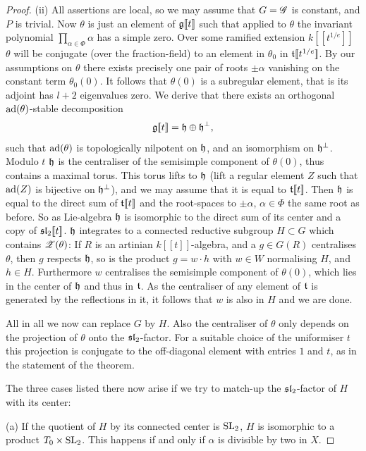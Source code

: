 \documentclass[12pt,english]{smfart}
\theoremstyle{plain} \newtheorem{innerthm}{Theorem} \newtheorem{innerlem}{Lemma} \newtheorem{innerprop}{Proposition} \newtheorem{innercor}{Corollary} \theoremstyle{definition} \newtheorem{innerdefn}{Definition} \newtheorem{innerconstr}{Construction} \theoremstyle{remark} \newtheorem*{remark}{Remark} \newtheorem*{remarks}{Remarks} \newtheorem*{applications}{Applications}
\begin{document}
\begin{proof}
(ii) All assertions are local, so we may assume that $G=\mathscr{G}$ is constant, and $P$ is trivial. Now $\theta$ is just an element of $\mathfrak{g}[\![t]\!]$ such that applied to $\theta$ the invariant polynomial $\prod_{\alpha\in\Phi}\alpha$ has a simple zero. Over some ramified extension $k[\![t^{1/e}]\!]$ $\theta$ will be conjugate (over the fraction-field) to an element in $\theta_0$ in $\mathfrak{t}[\![t^{1/e}]\!]$. By our assumptions on $\theta$ there exists precisely one pair of roots $\pm\alpha$ vanishing on the constant term $\theta_0(0)$. It follows that $\theta(0)$
is a subregular element, that is its adjoint has $l+2$ eigenvalues zero. We derive that there exists an orthogonal $\operatorname{ad}(\theta)$-stable decomposition
\[
\mathfrak{g}[\![t]\!]=\mathfrak{h}\oplus\mathfrak{h}^\perp,
\]
such that $\operatorname{ad}(\theta)$ is topologically nilpotent on $\mathfrak{h}$, and an isomorphism on $\mathfrak{h}^\perp$. Modulo $t$ $\mathfrak{h}$ is the centraliser of the semisimple component of $\theta(0)$, thus contains a maximal torus. This torus lifts to $\mathfrak{h}$ (lift a regular element $Z$ such that $\operatorname{ad}(Z)$ is bijective on $\mathfrak{h}^\perp$), and we may assume that it is equal to $\mathfrak{t}[\![t]\!]$. Then $\mathfrak{h}$ is equal to the direct sum of $\mathfrak{t}[\![t]\!]$ and the root-spaces to $\pm\alpha$, $\alpha\in\Phi$ the same root as before. So as Lie-algebra $\mathfrak{h}$ is isomorphic to the direct sum of its center and a copy of $\mathfrak{sl}_2[\![t]\!]$. $\mathfrak{h}$ integrates to a connected reductive subgroup $H\subset G$ which contains $\mathscr{Z}(\theta)$: If $R$ is an artinian $k[\![t]\!]$-algebra, and a $g\in G(R)$ centralises $\theta$, then $g$ respects $\mathfrak{h}$, so is the product $g=w\cdot h$ with $w\in W$ normalising $H$, and $h\in H$. Furthermore $w$ centralises the semisimple component of $\theta(0)$, which lies in the center of $\mathfrak{h}$ and thus in $\mathfrak{t}$. As the centraliser of any element of $\mathfrak{t}$ is generated by the reflections in it, it follows that $w$ is also in $H$ and we are done.

All in all we now can replace $G$ by $H$. Also the centraliser of $\theta$ only depends on the projection of $\theta$ onto the $\mathfrak{sl}_2$-factor. For a suitable choice of the uniformiser $t$ this projection is conjugate to the off-diagonal element with entries $1$ and $t$, as in the statement of the theorem.

The three cases listed there now arise if we try to match-up the $\mathfrak{sl}_2$-factor of $H$ with its center:

(a) If the quotient of $H$ by its connected center is $\operatorname{SL}_2$, $H$ is isomorphic to a product $T_0\times\operatorname{SL}_2$. This happens if and only if $\alpha$ is divisible by two in $X$.


\end{proof}
\end{document}
